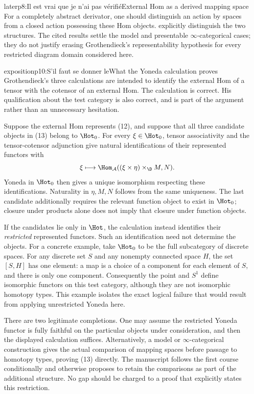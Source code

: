 \begin{dcomment}{later}{p8:Il est vrai que je n’ai pas vérifié}{External Hom as a derived mapping space}
For a completely abstract derivator, one should distinguish an action by spaces from a closed action possessing these Hom objects. \citet[Section 1, pp.~3--4, and Definition 4.2]{GrothShulman2017} explicitly distinguish the two structures. The cited results settle the model and presentable \(\infty\)-categorical cases; they do not justify erasing Grothendieck's representability hypothesis for every restricted diagram domain considered here.
\end{dcomment}

\begin{dcomment}{exposition}{p10:S’il faut se donner le}{What the Yoneda calculation proves}
Grothendieck's three calculations are intended to identify the external Hom of a tensor with the cotensor of an external Hom. The calculation is correct. His qualification about the test category is also correct, and is part of the argument rather than an unnecessary hesitation.

Suppose the external Hom represents (12), and suppose that all three candidate objects in (13) belong to \(\Hot_0\). For every \(\xi\in\Hot_0\), tensor associativity and the tensor-cotensor adjunction give natural identifications of their represented functors with
\[
 \xi\longmapsto
 \Hom_{\mathcal A}((\xi\times\eta)\times_{\D}M,N).
\]
Yoneda in \(\Hot_0\) then gives a unique isomorphism respecting these identifications. Naturality in \(\eta,M,N\) follows from the same uniqueness. The last candidate additionally requires the relevant function object to exist in \(\Hot_0\); closure under products alone does not imply that closure under function objects.

If the candidates lie only in \(\Hot\), the calculation instead identifies their \emph{restricted} represented functors. Such an identification need not determine the objects. For a concrete example, take \(\Hot_0\) to be the full subcategory of discrete spaces. For any discrete set \(S\) and any nonempty connected space \(H\), the set \([S,H]\) has one element: a map is a choice of a component for each element of \(S\), and there is only one component. Consequently the point and \(S^1\) define isomorphic functors on this test category, although they are not isomorphic homotopy types. This example isolates the exact logical failure that would result from applying unrestricted Yoneda here.

There are two legitimate completions. One may assume the restricted Yoneda functor is fully faithful on the particular objects under consideration, and then the displayed calculation suffices. Alternatively, a model or \(\infty\)-categorical construction gives the actual comparison of mapping spaces before passage to homotopy types, proving (13) directly. The manuscript follows the first course conditionally and otherwise proposes to retain the comparisons as part of the additional structure. No gap should be charged to a proof that explicitly states this restriction.
\end{dcomment}

